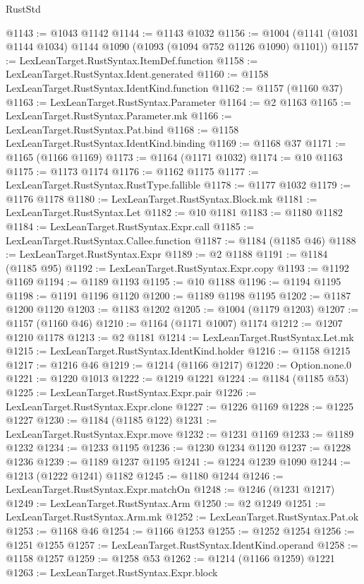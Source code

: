 \begin{lexlean}{RustStd}
\begin{coremodule}
@1143 := @1043 @1142
@1144 := @1143 @1032
@1156 := @1004 (@1141 (@1031 @1144 @1034) @1144 @1090 (@1093 (@1094 @752 @1126 @1090) @1101))
@1157 := LexLeanTarget.RustSyntax.ItemDef.function
@1158 := LexLeanTarget.RustSyntax.Ident.generated
@1160 := @1158 LexLeanTarget.RustSyntax.IdentKind.function
@1162 := @1157 (@1160 @37)
@1163 := LexLeanTarget.RustSyntax.Parameter
@1164 := @2 @1163
@1165 := LexLeanTarget.RustSyntax.Parameter.mk
@1166 := LexLeanTarget.RustSyntax.Pat.bind
@1168 := @1158 LexLeanTarget.RustSyntax.IdentKind.binding
@1169 := @1168 @37
@1171 := @1165 (@1166 @1169)
@1173 := @1164 (@1171 @1032)
@1174 := @10 @1163
@1175 := @1173 @1174
@1176 := @1162 @1175
@1177 := LexLeanTarget.RustSyntax.RustType.fallible
@1178 := @1177 @1032
@1179 := @1176 @1178
@1180 := LexLeanTarget.RustSyntax.Block.mk
@1181 := LexLeanTarget.RustSyntax.Let
@1182 := @10 @1181
@1183 := @1180 @1182
@1184 := LexLeanTarget.RustSyntax.Expr.call
@1185 := LexLeanTarget.RustSyntax.Callee.function
@1187 := @1184 (@1185 @46)
@1188 := LexLeanTarget.RustSyntax.Expr
@1189 := @2 @1188
@1191 := @1184 (@1185 @95)
@1192 := LexLeanTarget.RustSyntax.Expr.copy
@1193 := @1192 @1169
@1194 := @1189 @1193
@1195 := @10 @1188
@1196 := @1194 @1195
@1198 := @1191 @1196 @1120
@1200 := @1189 @1198 @1195
@1202 := @1187 @1200 @1120
@1203 := @1183 @1202
@1205 := @1004 (@1179 @1203)
@1207 := @1157 (@1160 @46)
@1210 := @1164 (@1171 @1007) @1174
@1212 := @1207 @1210 @1178
@1213 := @2 @1181
@1214 := LexLeanTarget.RustSyntax.Let.mk
@1215 := LexLeanTarget.RustSyntax.IdentKind.holder
@1216 := @1158 @1215
@1217 := @1216 @46
@1219 := @1214 (@1166 @1217)
@1220 := Option.none.{0}
@1221 := @1220 @1013
@1222 := @1219 @1221
@1224 := @1184 (@1185 @53)
@1225 := LexLeanTarget.RustSyntax.Expr.pair
@1226 := LexLeanTarget.RustSyntax.Expr.clone
@1227 := @1226 @1169
@1228 := @1225 @1227
@1230 := @1184 (@1185 @122)
@1231 := LexLeanTarget.RustSyntax.Expr.move
@1232 := @1231 @1169
@1233 := @1189 @1232
@1234 := @1233 @1195
@1236 := @1230 @1234 @1120
@1237 := @1228 @1236
@1239 := @1189 @1237 @1195
@1241 := @1224 @1239 @1090
@1244 := @1213 (@1222 @1241) @1182
@1245 := @1180 @1244
@1246 := LexLeanTarget.RustSyntax.Expr.matchOn
@1248 := @1246 (@1231 @1217)
@1249 := LexLeanTarget.RustSyntax.Arm
@1250 := @2 @1249
@1251 := LexLeanTarget.RustSyntax.Arm.mk
@1252 := LexLeanTarget.RustSyntax.Pat.ok
@1253 := @1168 @46
@1254 := @1166 @1253
@1255 := @1252 @1254
@1256 := @1251 @1255
@1257 := LexLeanTarget.RustSyntax.IdentKind.operand
@1258 := @1158 @1257
@1259 := @1258 @53
@1262 := @1214 (@1166 @1259) @1221
@1263 := LexLeanTarget.RustSyntax.Expr.block

\end{coremodule}
\end{lexlean}
